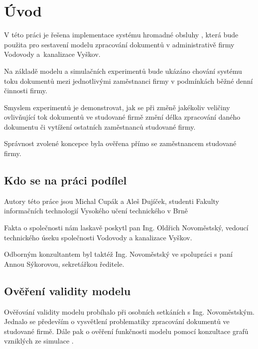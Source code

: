 \documentclass[12pt,a4paper]{article}
\begin{document}



\section{Úvod}

V této práci je řešena implementace systému hromadné obsluhy \cite{ims-sho}, která bude použita pro 
sestavení modelu \cite{ims-zakladni-pojmy} zpracování dokumentů v administrativě firmy Vodovody a~ka\-na\-li\-za\-ce Vyškov.

Na základě modelu a simulačních experimentů bude ukázáno 
chování systému \cite{ims-chovani-systemu} toku dokumentů mezi jednotlivými zaměstnanci firmy v podmínkách běžné denní činnosti firmy.

Smyslem experimentů je demonstrovat, jak se při změně jakékoliv veličiny ovlivňující tok dokumentů ve studované firmě změní délka zpracování daného dokumentu či vy\-tí\-že\-ní ostatních zaměstnanců studované firmy.

Správnost zvolené koncepce byla ověřena přímo se zaměstnancem studované firmy.


\subsection{Kdo se na práci podílel}
Autory této práce jsou Michal Cupák a Aleš Dujíček, studenti Fakulty informačních technologií Vysokého učení technického v Brně

Fakta o společnosti nám laskavě poskytl pan Ing. Oldřich Novoměstský, vedoucí technického úseku společnosti Vodovody a kanalizace Vyškov.

Odborným konzultantem byl taktéž Ing. Novoměstský ve spolupráci s paní Annou Sý\-ko\-ro\-vou, se\-kre\-tář\-kou ředitele.

\subsection{Ověření validity modelu}
Ověřování validity modelu probíhalo při osobních setkáních s Ing. Novoměstským. Jednalo se především o vysvětlení problematiky zpracování dokumentů ve studované firmě. Dále pak o ověření funkčnosti modelu pomocí konzultace grafů vzniklých ze simulace \cite{ims-zakladni-pojmy}.
\end{document}
